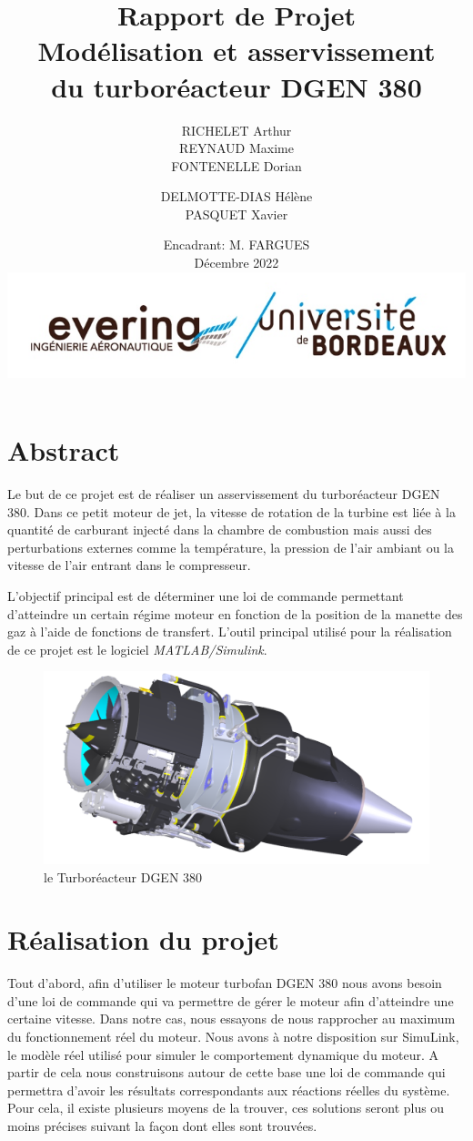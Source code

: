 \documentclass[12pt]{report}
\title{{\Huge Rapport de Projet} \\ \vspace{0.2cm} Modélisation et asservissement \\ du turboréacteur DGEN 380 }
\author{RICHELET Arthur
\\REYNAUD Maxime
\\FONTENELLE Dorian
\and
  DELMOTTE-DIAS Hélène
\\PASQUET Xavier}
\date{Encadrant: M. FARGUES \\ \vspace{0.5cm}
Décembre 2022 \\
\vspace{2cm}
\includegraphics[scale=0.4]{fig/evering_logo.jpg}}
\begin{document}
\maketitle

\tableofcontents


\newpage

\chapter{Abstract}

Le but de ce projet est de réaliser un asservissement
du turboréacteur DGEN 380.
Dans ce petit moteur de jet, la vitesse de rotation de la turbine 
est liée à la quantité de carburant injecté dans la chambre de 
combustion mais aussi des perturbations externes comme la température,
la pression de l'air ambiant ou la vitesse de l'air entrant dans le compresseur.\newline
 
L'objectif principal est de déterminer une loi de commande permettant d'atteindre un certain
régime moteur en fonction de la position de la manette des gaz à l'aide de fonctions de transfert. L'outil principal
utilisé pour la réalisation de ce projet est le logiciel {\it MATLAB/Simulink}.

\vspace{4cm}

\begin{figure}[h]
  \centering
  \includegraphics[scale=0.5,trim={0 0.2cm 0 0}]{fig/DGEN380.png}
  \caption{le Turboréacteur DGEN 380}
\end{figure}

\chapter{Réalisation du projet}

Tout d’abord, afin d’utiliser le moteur turbofan DGEN 380 nous avons besoin
d’une loi de commande qui va permettre de gérer le moteur afin d’atteindre
une certaine vitesse. Dans notre cas, nous essayons de nous rapprocher au
maximum du fonctionnement réel du moteur. Nous avons à notre disposition
sur SimuLink, le modèle réel utilisé pour simuler le comportement dynamique
du moteur. A partir de cela nous construisons 
autour de cette base une loi de commande qui permettra d’avoir les résultats
correspondants aux réactions réelles du système. Pour cela, il existe plusieurs
moyens de la trouver, ces solutions seront plus ou moins précises suivant la 
façon dont elles sont trouvées.
\end{document}

